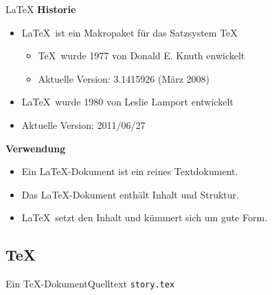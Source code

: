 
\begin{Frame}{\LaTeX}
  \textbf{\color{maincolor}Historie}
  \begin{itemize}
    \item \LaTeX\ ist ein Makropaket für das Satzsystem \TeX
      \begin{itemize}
        \item \TeX\ wurde 1977 von Donald E. Knuth enwickelt
        \item Aktuelle Version: 3.1415926 (März 2008)
      \end{itemize}
    \item \LaTeX\ wurde 1980 von Leslie Lamport entwickelt
    \item Aktuelle Version: 2011/06/27
  \end{itemize}

  \xxx
  \pause

  \textbf{\color{maincolor}Verwendung}
  \begin{itemize}
    \item Ein \LaTeX-Dokument ist ein \alert{reines Textdokument}.
    \item Das \LaTeX-Dokument enthält \alert{Inhalt und Struktur}.
    \item \LaTeX\ setzt den Inhalt und kümmert sich um \alert{gute Form}.
  \end{itemize}
\end{Frame}

\subsection{\TeX}

\begin{Frame}{Ein \TeX-Dokument}{Quelltext \texttt{story.tex}}
  
\end{Frame}

